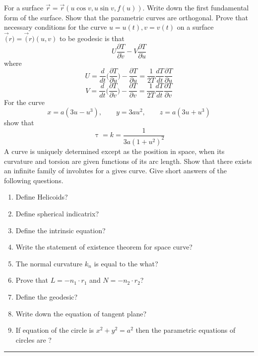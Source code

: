 \documentclass[11pt,paper=a4,answers]{exam}
\begin{document}
\begin{questions}

\pointsinrightmargin
\pointsdroppedatright
\marksnotpoints
\pointformat{\boldmath\themarginpoints}
\bracketedpoints
\question[06]
\label{Q:perunit}
For a surface $\vec{r}= \vec{r} (u \cos v, u \sin v, f(u))$. Write down the first fundamental form of the surface. Show that the parametric curves are orthogonal.
 \droppoints
 \question[10]
 \label{Q:zbus}
 Prove that necessary conditions for the curve $u = u(t), v = v(t)$ on a surface $\vec(r) = \vec(r)(u,v)$ to be geodesic is that \begin{equation}U \frac{\partial T}{\partial \dot{v}} - V    \frac{\partial T}{\partial \dot{u}}\end{equation}
where
$$ U = \frac{d}{dt} \Big(\frac{\partial T}{\partial \dot{u}}\Big) - \frac{\partial T}{\partial u} = \frac{1}{2T}\frac{dT}{dt}\frac{\partial T}{\partial \dot{u}}$$
$$ V = \frac{d}{dt} \Big(\frac{\partial T}{\partial    \dot{v}}\Big) - \frac{\partial T}{\partial v} = \frac{1}{2T}\frac{dT}{dt}\frac{\partial T}{\partial \dot{v}}$$
\droppoints
\question[8]
\label{Q:zbus}
For the curve
$$
x = a(3u - u^{3}),\qquad y = 3au^{2},\qquad z = a(3u + u^{3})
$$
show that $$\uptau = k  =  \frac{1}{3a(1+u^{2})^{2}}$$
\droppoints
\question[8]
\label{Q:zbus}
 A curve is uniquely determined except as the position in space, when its curvature and            torsion are given functions of its arc length.
\droppoints
\question[8]
\label{Q:zbus}
Show that there exists an infinite family of involutes for a  gives curve.
\droppoints
\newpage
\question[08]
\label{Q:ybus}
Give short answers of the following questions.
\begin{enumerate}
\item Define Helicoids?
\item Define spherical indicatrix?
\item Define the intrinsic equation?
\item Write the statement of existence theorem for space curve?
\item The normal curvature $k_{n}$ is equal to the what?
\item Prove that $L = -n_{1} \cdot r_{1}$ and $N = -n_{2}    \cdot r_{2}$?
\item Define the geodesic?
\item Write down the equation of tangent plane?
\item If equation of the circle is $x^{2} + y^{2} = a^{2}$ then the parametric equations            of circles are ?
\end{enumerate}
\end{questions}
\begin{center}
\rule{.5\textwidth}{1pt}
\end{center}
\end{document}
